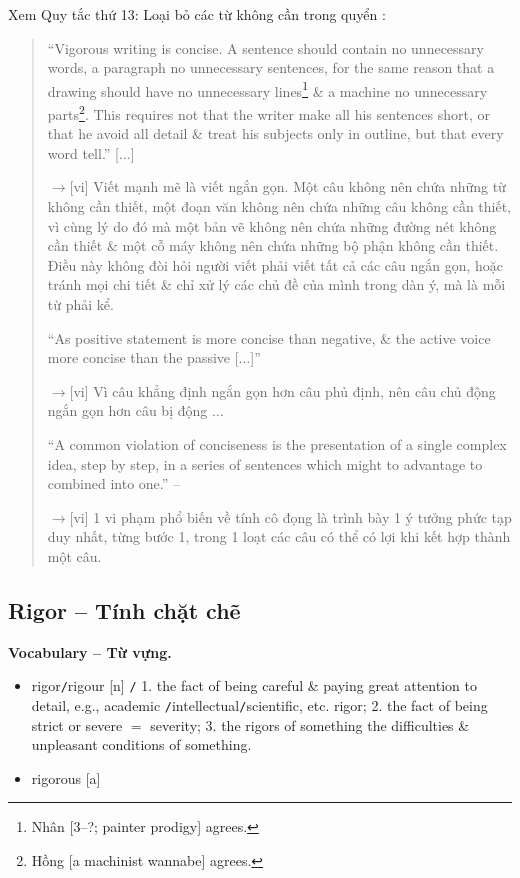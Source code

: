 \documentclass[12pt,twoside]{book}
\begin{document}
Xem Quy tắc thứ 13: Loại bỏ các từ không cần trong quyển \cite{Strunk_element_style,Strunk_White_element_style}:
\begin{quote}
	``Vigorous writing is concise. A sentence should contain no unnecessary words, a paragraph no unnecessary sentences, for the same reason that a drawing should have no unnecessary lines\footnote{{\sf Nhân [3--?; painter prodigy]} agrees.} \& a machine no unnecessary parts\footnote{{\sf Hồng [a machinist wannabe]} agrees.}. This requires not that the writer make all his sentences short, or that he avoid all detail \& treat his subjects only in outline, but that every word tell.'' [$\ldots$]
	
	{\sf[en]$\to$[vi]} Viết mạnh mẽ là viết ngắn gọn. Một câu không nên chứa những từ không cần thiết, một đoạn văn không nên chứa những câu không cần thiết, vì cùng lý do đó mà một bản vẽ không nên chứa những đường nét không cần thiết \& một cỗ máy không nên chứa những bộ phận không cần thiết. Điều này không đòi hỏi người viết phải viết tất cả các câu ngắn gọn, hoặc tránh mọi chi tiết \& chỉ xử lý các chủ đề của mình trong dàn ý, mà là mỗi từ phải kể.
	
	``As positive statement is more concise than negative, \& the active voice more concise than the passive [$\ldots$]''
	
	{\sf[en]$\to$[vi]} Vì câu khẳng định ngắn gọn hơn câu phủ định, nên câu chủ động ngắn gọn hơn câu bị động $\ldots$
	
	``A common violation of conciseness is the presentation of a single complex idea, step by step, in a series of sentences which might to advantage to combined into one.'' -- \cite[Rule 13: Omit needless words]{Strunk_element_style,Strunk_White_element_style}
	
	{\sf[en]$\to$[vi]} 1 vi phạm phổ biến về tính cô đọng là trình bày 1 ý tưởng phức tạp duy nhất, từng bước 1, trong 1 loạt các câu có thể có lợi khi kết hợp thành một câu.
\end{quote}

\subsection{Rigor -- Tính chặt chẽ}
\textbf{\textsf{\small Vocabulary -- Từ vựng.}}
\begin{itemize}\small
	\item {\sf rigor{\tt/}rigour} [n] {\tt/} 1. the fact of being careful \& paying great attention to detail, e.g., academic {\tt/}intellectual{\tt/}scientific, etc. rigor; 2. the fact of being strict or severe $=$ {\sf severity}; 3. {\sf the rigors of something} the difficulties \& unpleasant conditions of something.
	\item {\sf rigorous} [a] 
\end{itemize}
\end{document}
